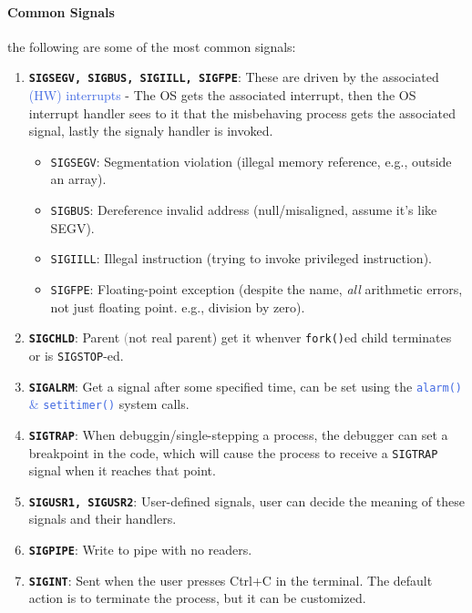 \documentclass[openany,12pt]{book}
\newcommand{\code}[1]{\texttt{#1}}
\newcommand{\blue}[1]{\textcolor{RoyalBlue}{#1}}
\newcommand{\gray}[1]{\textcolor{gray}{#1}}
\begin{document}
\paragraph{Common Signals} the following are some of the most common signals:
\begin{enumerate}
    \item \textbf{\code{SIGSEGV, SIGBUS, SIGIILL, SIGFPE}}: These are driven by the associated \blue{(HW) interrupts} - The OS gets the associated interrupt, then the OS interrupt handler sees to it that the misbehaving process gets the associated signal, lastly the signaly handler is invoked.
          \begin{itemize}
              \item \texttt{SIGSEGV}: Segmentation violation (illegal memory reference, e.g., outside an array).
              \item \texttt{SIGBUS}: Dereference invalid address (null/misaligned, assume it's like SEGV).
              \item \texttt{SIGIILL}: Illegal instruction (trying to invoke privileged instruction).
              \item \texttt{SIGFPE}: Floating-point exception (despite the name, \textit{all} arithmetic errors, not just floating point. e.g., division by zero).
          \end{itemize}

    \item \textbf{\code{SIGCHLD}}: Parent \gray(not real parent) get it whenver \code{fork()}ed child terminates or is \code{SIGSTOP}-ed.

    \item \textbf{\code{SIGALRM}}: Get a signal after some specified time, can be set using the \blue{\code{alarm()} \& \code{setitimer()}} system calls.

    \item \textbf{\code{SIGTRAP}}: When debuggin/single-stepping a process, the debugger can set a breakpoint in the code, which will cause the process to receive a \texttt{SIGTRAP} signal when it reaches that point.

    \item \textbf{\code{SIGUSR1, SIGUSR2}}: User-defined signals, user can decide the meaning of these signals and their handlers.

    \item \textbf{\code{SIGPIPE}}: Write to pipe with no readers.

    \item \textbf{\code{SIGINT}}: Sent when the user presses Ctrl+C in the terminal. The default action is to terminate the process, but it can be customized.


\end{enumerate}
\end{document}
